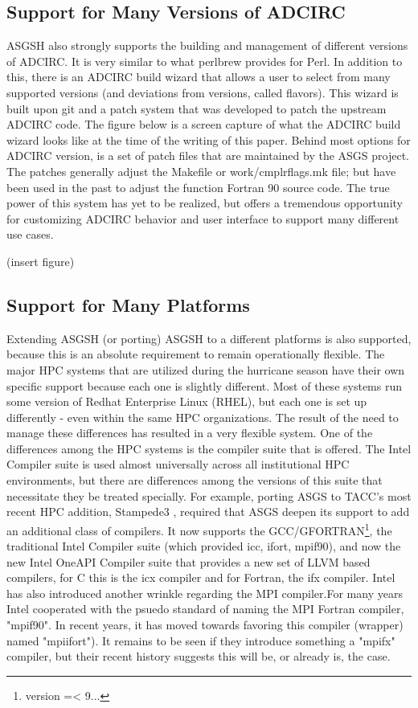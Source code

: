 \documentclass{article}
\begin{document}
\subsection{Support for Many Versions of ADCIRC}

ASGSH also strongly supports the building and management of different versions
of ADCIRC. It is very similar to what perlbrew provides for Perl. In addition to
this, there is an ADCIRC build wizard that allows a user to select from many
supported versions (and deviations from versions, called flavors). This wizard
is built upon git and a patch system that was developed to patch the upstream
ADCIRC code. The figure below is a screen capture of what the ADCIRC build
wizard looks like at the time of the writing of this paper. Behind most options
for ADCIRC version, is a set of patch files that are maintained by the ASGS
project. The patches generally adjust the Makefile or work/cmplrflags.mk file;
but have been used in the past to adjust the function Fortran 90 source code.
The true power of this system has yet to be realized, but offers a tremendous
opportunity for customizing ADCIRC behavior and user interface to support many
different use cases.

(insert figure)

\subsection{Support for Many Platforms}

Extending ASGSH (or porting) ASGSH to a different platforms is also supported,
because this is an absolute requirement to remain operationally flexible. The
major HPC systems that are utilized during the hurricane season have their own
specific support because each one is slightly different. Most of these systems
run some version of Redhat Enterprise Linux (RHEL), but each one is set up
differently - even within the same HPC organizations. The result of the need to
manage these differences has resulted in a very flexible system.  One of the
differences among the HPC systems is the compiler suite that is offered. The
Intel Compiler suite is used almost universally across all institutional HPC
environments, but there are differences among the versions of this suite that
necessitate they be treated specially. For example, porting ASGS to TACC's most
recent HPC addition, Stampede3 \cite{}, required that ASGS deepen its support to
add an additional class of compilers. It now supports the
GCC/GFORTRAN\footnote{version =< 9...}, the traditional Intel Compiler suite
(which provided icc, ifort, mpif90), and now the new Intel OneAPI Compiler suite
that provides a new set of LLVM based compilers, for C this is the icx compiler
and for Fortran, the ifx compiler. Intel has also introduced another wrinkle
regarding the MPI compiler.For many years Intel cooperated with the psuedo
standard of naming the MPI Fortran compiler, "mpif90". In recent years, it has
moved towards favoring this compiler (wrapper) named "mpiifort"). It remains to
be seen if they introduce something a "mpifx" compiler, but their recent history
suggests this will be, or already is, the case.
\end{document}
